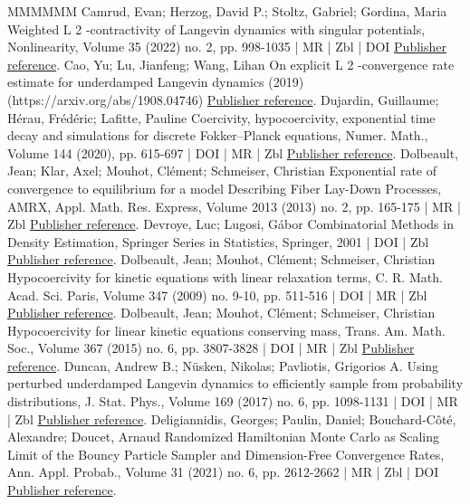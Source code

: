 \begin{thebibliography}{MMMMMM}
 Camrud, Evan; Herzog, David P.; Stoltz, Gabriel; Gordina, Maria Weighted L 2 -contractivity of Langevin dynamics with singular potentials, Nonlinearity, Volume 35 (2022) no. 2, pp. 998-1035 | MR | Zbl | DOI \href{https://ahl.centre-mersenne.org/item/AHL_2022__5__523_0/#CHSG21}{Publisher reference}.
 Cao, Yu; Lu, Jianfeng; Wang, Lihan On explicit L 2 -convergence rate estimate for underdamped Langevin dynamics (2019) (https://arxiv.org/abs/1908.04746) \href{https://ahl.centre-mersenne.org/item/AHL_2022__5__523_0/#CLW19}{Publisher reference}.
 Dujardin, Guillaume; Hérau, Frédéric; Lafitte, Pauline Coercivity, hypocoercivity, exponential time decay and simulations for discrete Fokker–Planck equations, Numer. Math., Volume 144 (2020), pp. 615-697 | DOI | MR | Zbl \href{https://ahl.centre-mersenne.org/item/AHL_2022__5__523_0/#DHL19}{Publisher reference}.
 Dolbeault, Jean; Klar, Axel; Mouhot, Clément; Schmeiser, Christian Exponential rate of convergence to equilibrium for a model Describing Fiber Lay-Down Processes, AMRX, Appl. Math. Res. Express, Volume 2013 (2013) no. 2, pp. 165-175 | MR | Zbl \href{https://ahl.centre-mersenne.org/item/AHL_2022__5__523_0/#DKMS13}{Publisher reference}.
 Devroye, Luc; Lugosi, Gábor Combinatorial Methods in Density Estimation, Springer Series in Statistics, Springer, 2001 | DOI | Zbl \href{https://ahl.centre-mersenne.org/item/AHL_2022__5__523_0/#dev2001}{Publisher reference}.
 Dolbeault, Jean; Mouhot, Clément; Schmeiser, Christian Hypocoercivity for kinetic equations with linear relaxation terms, C. R. Math. Acad. Sci. Paris, Volume 347 (2009) no. 9-10, pp. 511-516 | DOI | MR | Zbl \href{https://ahl.centre-mersenne.org/item/AHL_2022__5__523_0/#DMS09}{Publisher reference}.
 Dolbeault, Jean; Mouhot, Clément; Schmeiser, Christian Hypocoercivity for linear kinetic equations conserving mass, Trans. Am. Math. Soc., Volume 367 (2015) no. 6, pp. 3807-3828 | DOI | MR | Zbl \href{https://ahl.centre-mersenne.org/item/AHL_2022__5__523_0/#DMS15}{Publisher reference}.
 Duncan, Andrew B.; Nüsken, Nikolas; Pavliotis, Grigorios A. Using perturbed underdamped Langevin dynamics to efficiently sample from probability distributions, J. Stat. Phys., Volume 169 (2017) no. 6, pp. 1098-1131 | DOI | MR | Zbl \href{https://ahl.centre-mersenne.org/item/AHL_2022__5__523_0/#DNS17}{Publisher reference}.
 Deligiannidis, Georges; Paulin, Daniel; Bouchard-Côté, Alexandre; Doucet, Arnaud Randomized Hamiltonian Monte Carlo as Scaling Limit of the Bouncy Particle Sampler and Dimension-Free Convergence Rates, Ann. Appl. Probab., Volume 31 (2021) no. 6, pp. 2612-2662 | MR | Zbl | DOI \href{https://ahl.centre-mersenne.org/item/AHL_2022__5__523_0/#DPD18}{Publisher reference}.

\end{thebibliography}
